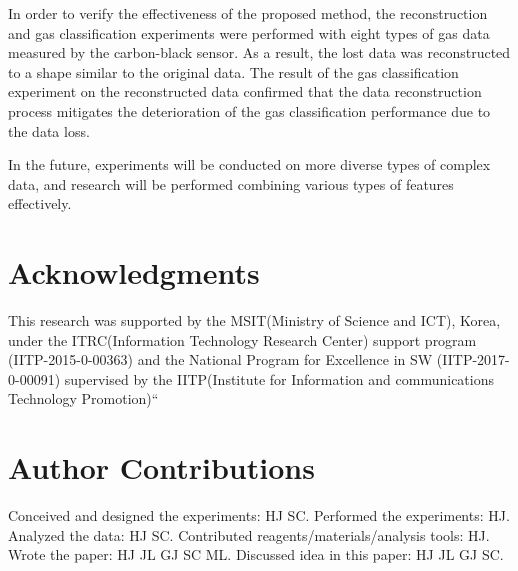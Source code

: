 \documentclass[10pt,letterpaper]{article}
\begin{document}
In order to verify the effectiveness of the proposed method, the reconstruction and gas classification experiments were performed with eight types of gas data measured by the carbon-black sensor.
As a result, the lost data was reconstructed to a shape similar to the original data. 
The result of the gas classification experiment on the reconstructed data confirmed that the data reconstruction process mitigates the deterioration of the gas classification performance due to the data loss. 

In the future, experiments will be conducted on more diverse types of complex data, and research will be performed combining various types of features effectively.

\section*{Acknowledgments}
This research was supported by the MSIT(Ministry of Science and ICT), Korea, under the ITRC(Information Technology Research Center) support program (IITP-2015-0-00363) and the National Program for Excellence in SW (IITP-2017-0-00091)
supervised by the IITP(Institute for Information and communications Technology Promotion)“

\section*{Author Contributions}
Conceived and designed the experiments: HJ SC. Performed the experiments: HJ. Analyzed
the data: HJ SC. Contributed reagents/materials/analysis tools: HJ. Wrote the paper: HJ JL GJ SC
ML. Discussed idea in this paper: HJ JL GJ SC.


\end{document}
